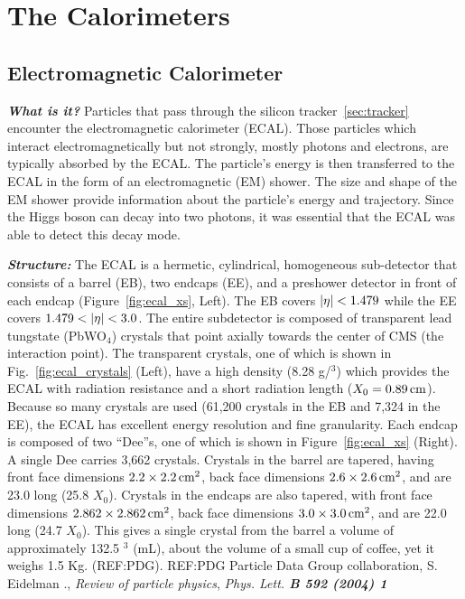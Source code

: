 \section{The Calorimeters}
\label{sec:calo}

\subsection{Electromagnetic Calorimeter}
\label{subsec:ecal}

\textit{\textbf{What is it?}}
Particles that pass through the silicon tracker~\ref{sec:tracker} encounter the electromagnetic calorimeter (ECAL).
Those particles which interact electromagnetically but not strongly, mostly photons and electrons, are typically absorbed by the ECAL.
The particle's energy is then transferred to the ECAL in the form of an electromagnetic (EM) shower.
The size and shape of the EM shower provide information about the particle's energy and trajectory.
Since the Higgs boson can decay into two photons, it was essential that the ECAL was able to detect this decay mode.

\textit{\textbf{Structure:}}
The ECAL is a hermetic, cylindrical, homogeneous sub-detector that consists of a barrel (EB), two endcaps (EE), and a preshower detector in front of each endcap (Figure~\ref{fig:ecal_xs}, Left).
The EB covers $\left|\eta\right| < 1.479$ while the EE covers $1.479 < \left|\eta\right| < 3.0$.
The entire subdetector is composed of transparent lead tungstate (PbWO$_4$) crystals that point axially towards the center of CMS (the interaction point).
The transparent crystals, one of which is shown in Fig.~\ref{fig:ecal_crystals} (Left), have a high density (8.28 g/\cm$^3$) which provides the ECAL with radiation resistance and a short radiation length ($X_0 = 0.89 \,\text{cm}$).
Because so many crystals are used (61,200 crystals in the EB and 7,324 in the EE), the ECAL has excellent energy resolution and fine granularity.
Each endcap is composed of two ``Dee''s, one of which is shown in Figure~\ref{fig:ecal_xs} (Right).
A single Dee carries 3,662 crystals.
Crystals in the barrel are tapered, having front face dimensions $2.2 \times 2.2 \,\text{cm}^2$, back face dimensions $2.6 \times 2.6 \,\text{cm}^2$, and are 23.0 \cm long (25.8 $X_0$).
Crystals in the endcaps are also tapered, with front face dimensions $2.862 \times 2.862 \,\text{cm}^2$, back face dimensions $3.0 \times 3.0 \,\text{cm}^2$, and are 22.0 \cm long (24.7 $X_0$).
This gives a single crystal from the barrel a volume of approximately 132.5 \cm$^3$ (mL), about the volume of a small cup of coffee, yet it weighs 1.5 Kg.
(REF:PDG).
REF:PDG
Particle Data Group collaboration, S. Eidelman \etal., \textit{Review of particle physics},
\textit{Phys. Lett. \textbf{B 592 (2004) 1}}

